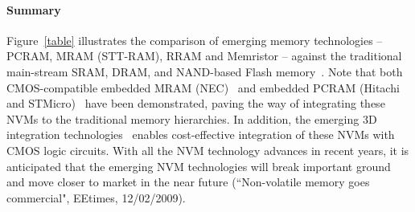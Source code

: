 \paragraph{Summary}
Figure~\ref{table} illustrates the comparison of emerging memory technologies -- PCRAM, MRAM (STT-RAM), RRAM and Memristor -- against the traditional main-stream SRAM, DRAM, and NAND-based Flash memory~\cite{ITRS07}. Note that both CMOS-compatible embedded MRAM (NEC)~\cite{MRAM:NEC09} and embedded PCRAM (Hitachi and STMicro)~\cite{Hanzawa07,PRAM:ST2004} have been demonstrated, paving the way of integrating these NVMs to the traditional memory hierarchies. In addition, the emerging 3D integration technologies~\cite{xie:jetcs06,Xie:dac08} enables cost-effective integration of these NVMs with CMOS logic circuits. With all the NVM technology advances in recent years, it is anticipated that the emerging NVM technologies will break important ground and move closer to market in the near future (``Non-volatile memory goes commercial", EEtimes, 12/02/2009).


